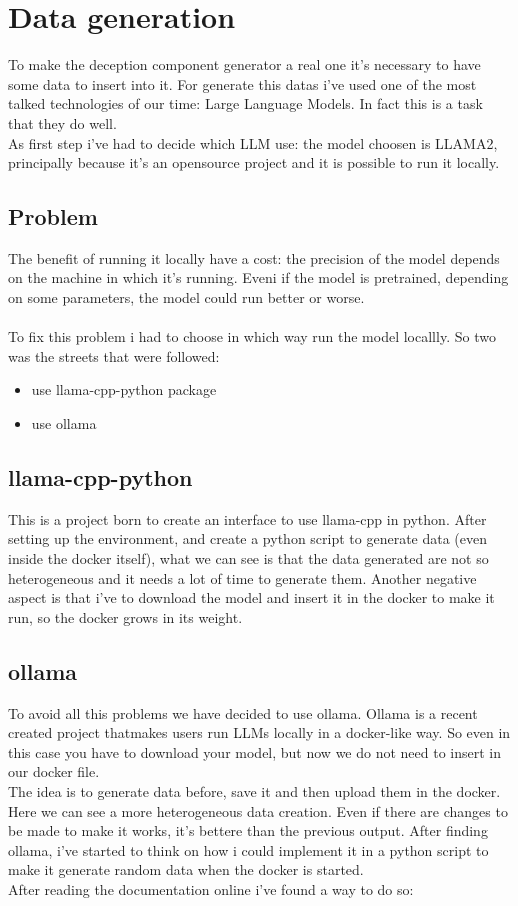 \chapter{Data generation}
To make the deception component generator a real one it's necessary to have some data to insert into it.
For generate this datas i've used one of the most talked technologies of our time: Large Language Models. In fact this is a task that they do well.
\\
As first step i've had to decide which LLM use: the model choosen is LLAMA2, principally because it's an opensource project and it is possible to run it locally.
\section{Problem}
The benefit of running it locally have a cost: the precision of the model depends on the machine in which it's running. Eveni if the model is pretrained, depending on some parameters, the model could run better or worse.
\\\\
To fix this problem i had to choose in which way run the model locallly. So two was the streets that were followed:
\begin{itemize}
    \item use llama-cpp-python package
    \item use ollama
\end{itemize}
\section{llama-cpp-python}
This is a project born to create an interface to use llama-cpp in python.
After setting up the environment, and create a python script to generate data (even inside the docker itself), what we can see is that the data generated are not so heterogeneous and it needs a lot of time to generate them.
Another negative aspect is that i've to download the model and insert it in the docker to make it run, so the docker grows in its weight.
\section{ollama}
To avoid all this problems we have decided to use ollama. Ollama is a recent created project thatmakes users run LLMs locally in a docker-like way. So even in this case you have to download your model, but now we do not need to insert in our docker file.
\\
The idea is to generate data before, save it and then upload them in the docker.
Here we can see a more heterogeneous data creation. Even if there are changes to be made to make it works, it's bettere than the previous output.
After finding ollama, i've started to think on how i could implement it in a python script to make it generate random data when the docker is started.
\\
After reading the documentation online i've found a way to do so:
\begin{mdframed}[backgroundcolor=bpy]

\end{mdframed}

